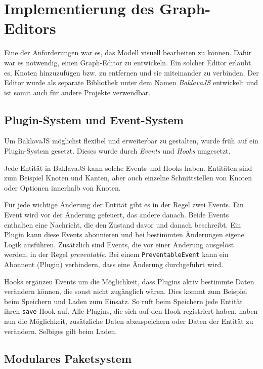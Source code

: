 
\chapter{Implementierung des Graph-Editors}
\label{sec:grapheditor}

Eine der Anforderungen war es, das Modell visuell bearbeiten zu können. Dafür war es notwendig, einen Graph-Editor zu entwickeln. Ein solcher Editor erlaubt es, Knoten hinzuzufügen bzw. zu entfernen und sie miteinander zu verbinden. Der Editor wurde als separate Bibliothek unter dem Namen \textit{BaklavaJS} entwickelt und ist somit auch für andere Projekte verwendbar.

\section{Plugin-System und Event-System}

Um BaklavaJS möglichst flexibel und erweiterbar zu gestalten, wurde früh auf ein Plugin-System gesetzt. Dieses wurde durch \textit{Events} und \textit{Hooks} umgesetzt.

Jede Entität in BaklavaJS kann solche Events und Hooks haben. Entitäten sind zum Beispiel Knoten und Kanten, aber auch einzelne Schnittstellen von Knoten oder Optionen innerhalb von Knoten.

Für jede wichtige Änderung der Entität gibt es in der Regel zwei Events. Ein Event wird vor der Änderung gefeuert, das andere danach. Beide Events enthalten eine Nachricht, die den Zustand davor und danach beschreibt. Ein Plugin kann diese Events abonnieren und bei bestimmten Änderungen eigene Logik ausführen. Zusätzlich sind Events, die vor einer Änderung ausgelöst werden, in der Regel \textit{preventable}. Bei einem \texttt{PreventableEvent} kann ein Abonnent (Plugin) verhindern, dass eine Änderung durchgeführt wird.

Hooks ergänzen Events um die Möglichkeit, dass Plugins aktiv bestimmte Daten verändern können, die sonst nicht zugänglich wären. Dies kommt zum Beispiel beim Speichern und Laden zum Einsatz. So ruft beim Speichern jede Entität ihren \texttt{save}-Hook auf. Alle Plugins, die sich auf den Hook registriert haben, haben nun die Möglichkeit, zusätzliche Daten abzuspeichern oder Daten der Entität zu verändern. Selbiges gilt beim Laden.

\section{Modulares Paketsystem}

